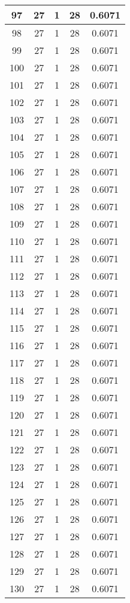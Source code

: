 \documentclass[letterpaper, 12pt]{article}
\begin{document}
\begin{longtable}{|c|c|c|c|c|}
\hline
97 & 27 & 1 & 28 & 0.6071 \\
\hline
98 & 27 & 1 & 28 & 0.6071 \\
\hline
99 & 27 & 1 & 28 & 0.6071 \\
\hline
100 & 27 & 1 & 28 & 0.6071 \\
\hline
101 & 27 & 1 & 28 & 0.6071 \\
\hline
102 & 27 & 1 & 28 & 0.6071 \\
\hline
103 & 27 & 1 & 28 & 0.6071 \\
\hline
104 & 27 & 1 & 28 & 0.6071 \\
\hline
105 & 27 & 1 & 28 & 0.6071 \\
\hline
106 & 27 & 1 & 28 & 0.6071 \\
\hline
107 & 27 & 1 & 28 & 0.6071 \\
\hline
108 & 27 & 1 & 28 & 0.6071 \\
\hline
109 & 27 & 1 & 28 & 0.6071 \\
\hline
110 & 27 & 1 & 28 & 0.6071 \\
\hline
111 & 27 & 1 & 28 & 0.6071 \\
\hline
112 & 27 & 1 & 28 & 0.6071 \\
\hline
113 & 27 & 1 & 28 & 0.6071 \\
\hline
114 & 27 & 1 & 28 & 0.6071 \\
\hline
115 & 27 & 1 & 28 & 0.6071 \\
\hline
116 & 27 & 1 & 28 & 0.6071 \\
\hline
117 & 27 & 1 & 28 & 0.6071 \\
\hline
118 & 27 & 1 & 28 & 0.6071 \\
\hline
119 & 27 & 1 & 28 & 0.6071 \\
\hline
120 & 27 & 1 & 28 & 0.6071 \\
\hline
121 & 27 & 1 & 28 & 0.6071 \\
\hline
122 & 27 & 1 & 28 & 0.6071 \\
\hline
123 & 27 & 1 & 28 & 0.6071 \\
\hline
124 & 27 & 1 & 28 & 0.6071 \\
\hline
125 & 27 & 1 & 28 & 0.6071 \\
\hline
126 & 27 & 1 & 28 & 0.6071 \\
\hline
127 & 27 & 1 & 28 & 0.6071 \\
\hline
128 & 27 & 1 & 28 & 0.6071 \\
\hline
129 & 27 & 1 & 28 & 0.6071 \\
\hline
130 & 27 & 1 & 28 & 0.6071 \\

\end{longtable}
\end{document}

